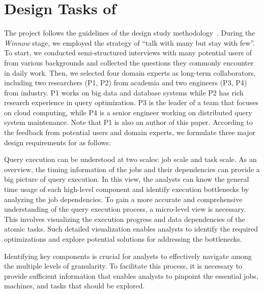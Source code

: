 \section{Design Tasks of \qevis{}} \label{sec:qevisgoals}

The \qevis{} project follows the guidelines of the design study methodology~\cite{sedlmair2012design}. 
During the \textit{Winnow} stage, we employed the strategy of ``talk with many but stay with few''. 
To start, we conducted semi-structured interviews with many potential users of \qevis{} from various backgrounds and collected the questions they commonly encounter in  daily work.  
Then, we selected four domain experts as long-term collaborators, including two researchers (P1, P2) from academia and two engineers (P3, P4) from industry. P1 works on big data and database systems 
while P2 has rich research experience in query optimization. P3 is the leader of a team that focuses on cloud computing, while P4 is a senior engineer working on distributed query system maintenance. Note that P1 is also an author of this paper.
According to the feedback from potential users and domain experts, we formulate three major design requirements for \qevis{} as follows:

Query execution can be understood at two scales: job scale and task scale. 
As an overview, the timing information of the jobs and their dependencies can provide a big picture of query execution. In this view, the analysts can know the general time usage of each high-level component and identify execution bottlenecks by analyzing the job dependencies.
To gain a more accurate and comprehensive understanding of the query execution process, a micro-level view is necessary. This involves visualizing the execution progress and data dependencies of the atomic tasks. 
Such detailed visualization enables analysts to identify the required optimizations and explore potential solutions for addressing the bottlenecks.

 Identifying key components is crucial for analysts to effectively navigate among the multiple levels of granularity. To facilitate this process, it is necessary to provide sufficient information that enables analysts to pinpoint the essential jobs, machines, and tasks that should be explored.

